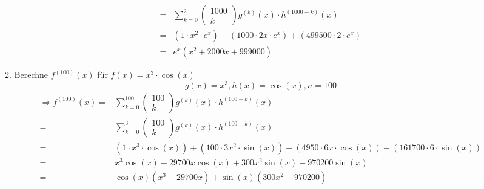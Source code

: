 \documentclass{HM}
\begin{document}
\begin{enumerate}
\begin{enumerate}
\begin{align*}
=&\sum\limits_{k=0}^{2}\begin{pmatrix}
1000\\k
\end{pmatrix}g^{(k)}(x)\cdot h^{(1000-k)}(x)\\
=&(1\cdot x^2\cdot e^x)+(1000\cdot 2x\cdot e^x)+
(499500\cdot 2\cdot e^x)\\
=&e^x(x^2+2000x+999000)
	\end{align*}
	\item Berechne $f^{(100)}(x)$ für $f(x)=x^3\cdot \cos(x)$\\
	$$g(x)=x^3, h(x)=\cos(x), n=100$$
	\begin{align*}
	\Rightarrow f^{(100)}(x)=&\sum\limits_{k=0}^{100}\begin{pmatrix}
100\\k
\end{pmatrix} g^{(k)}(x)\cdot h^{(100-k)}(x)\\
=&\sum\limits_{k=0}^{3}\begin{pmatrix}
100\\k
\end{pmatrix}g^{(k)}(x)\cdot h^{(100-k)}(x)\\
=&(1\cdot x^3\cdot \cos(x))+(100\cdot 3x^2\cdot \sin(x))-(4950\cdot 6x\cdot \cos(x))-(161700\cdot 6\cdot \sin(x))\\
=&x^3\cos(x)-29700x\cos(x)+300x^2\sin(x)-970200\sin(x)\\
=&\cos(x)(x^3-29700x)+\sin(x)(300x^2-970200)
	\end{align*}
\end{enumerate}
\end{enumerate}
\end{document}
